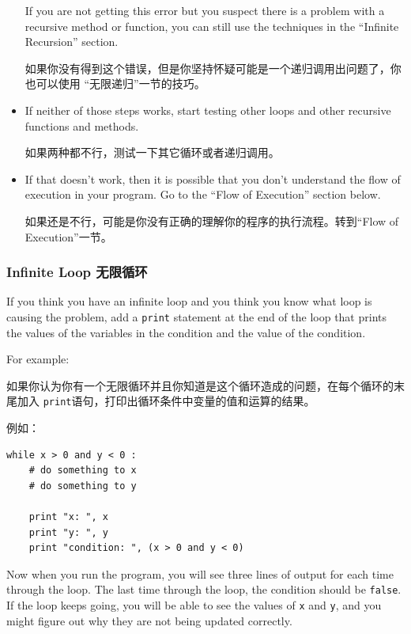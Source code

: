 \documentclass[10pt]{book}
\begin{document}
\begin{CJK}{UTF8}{gbsn}
\begin{itemize}
If you are not getting this error but you suspect there is a problem
with a recursive method or function, you can still use the techniques
in the ``Infinite Recursion'' section.

如果你没有得到这个错误，但是你坚持怀疑可能是一个递归调用出问题了，你也可以使用
``无限递归''一节的技巧。

\item If neither of those steps works, start testing other
loops and other recursive functions and methods.

如果两种都不行，测试一下其它循环或者递归调用。

\item If that doesn't work, then it is possible that
you don't understand the flow of execution in your program.
Go to the ``Flow of Execution'' section below.

如果还是不行，可能是你没有正确的理解你的程序的执行流程。转到``Flow of Execution''一节。

\end{itemize}


\subsubsection{Infinite Loop 无限循环}

If you think you have an infinite loop and you think you know
what loop is causing the problem, add a {\tt print} statement at
the end of the loop that prints the values of the variables in
the condition and the value of the condition.

For example:

如果你认为你有一个无限循环并且你知道是这个循环造成的问题，在每个循环的末尾加入
{\tt print}语句，打印出循环条件中变量的值和运算的结果。

例如：

\begin{verbatim}
while x > 0 and y < 0 :
    # do something to x
    # do something to y

    print "x: ", x
    print "y: ", y
    print "condition: ", (x > 0 and y < 0)
\end{verbatim}
%
Now when you run the program, you will see three lines of output
for each time through the loop.  The last time through the
loop, the condition should be {\tt false}.  If the loop keeps
going, you will be able to see the values of {\tt x} and {\tt y},
and you might figure out why they are not being updated correctly.


\end{CJK}
\end{document}
